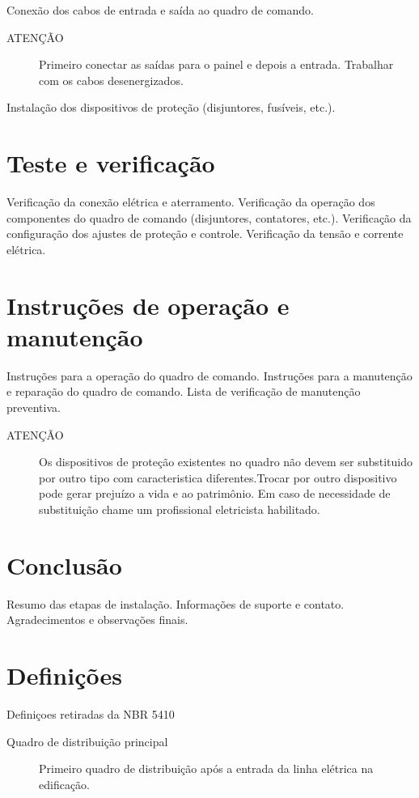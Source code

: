 Conexão dos cabos de entrada e saída ao quadro de comando.
\begin{description}
\item[ATENÇÃO] Primeiro conectar as saídas para o painel e depois a entrada. Trabalhar com os cabos desenergizados. 
\end{description}
 
Instalação dos dispositivos de proteção (disjuntores, fusíveis, etc.).

\section{Teste e verificação}
Verificação da conexão elétrica e aterramento.
Verificação da operação dos componentes do quadro de comando (disjuntores, contatores, etc.). 
Verificação da configuração dos ajustes de proteção e controle. Verificação da tensão e corrente elétrica.

\section{Instruções de operação e manutenção}
Instruções para a operação do quadro de comando. Instruções para a manutenção e reparação do quadro de comando. Lista de verificação de manutenção preventiva.
\begin{description}
\item[ATENÇÃO] Os dispositivos de proteção existentes no quadro não devem ser substituido por outro tipo com caracteristica diferentes.Trocar por outro dispositivo pode gerar prejuízo a vida e ao patrimônio.  Em caso de necessidade de substituição chame um profissional eletricista habilitado. 
\end{description}

\section{Conclusão}
Resumo das etapas de instalação. Informações de suporte e contato. Agradecimentos e observações finais.
\section{Definições}
Definiçoes retiradas da NBR 5410
\begin{description}
\item[Quadro de distribuição principal] Primeiro quadro de distribuição após a entrada da linha elétrica na edificação.
\end{description}






%
